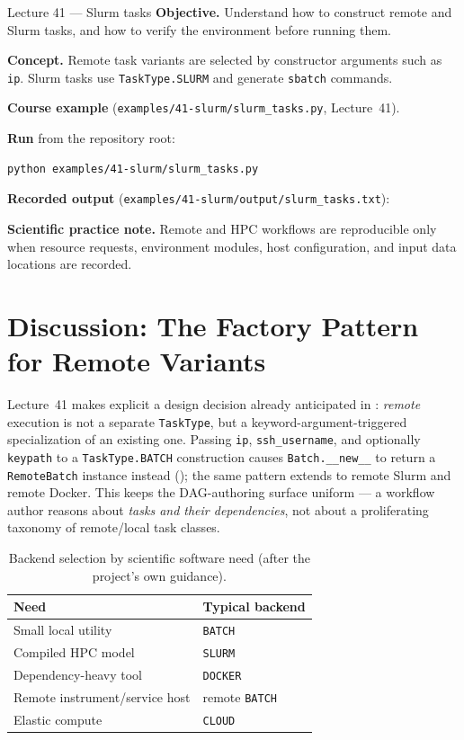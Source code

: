 \begin{lessonbox}{Lecture 41 --- Slurm tasks}
\textbf{Objective.} Understand how to construct remote and Slurm tasks, and
how to verify the environment before running them.

\textbf{Concept.} Remote task variants are selected by constructor arguments
such as \texttt{ip}. Slurm tasks use \texttt{TaskType.SLURM} and generate
\texttt{sbatch} commands.

\textbf{Course example} (\texttt{examples/41-slurm/slurm\_tasks.py}, Lecture~41).


\textbf{Run} from the repository root:
\begin{lstlisting}[style=bash]
python examples/41-slurm/slurm_tasks.py
\end{lstlisting}

\textbf{Recorded output} (\texttt{examples/41-slurm/output/slurm\_tasks.txt}):


\textbf{Scientific practice note.} Remote and HPC workflows are reproducible
only when resource requests, environment modules, host configuration, and
input data locations are recorded.
\end{lessonbox}

\section{Discussion: The Factory Pattern for Remote Variants}

Lecture~41 makes explicit a design decision already anticipated in
: \emph{remote} execution is not a separate
\texttt{TaskType}, but a keyword-argument-triggered specialization of an
existing one. Passing \texttt{ip}, \texttt{ssh\_username}, and optionally
\texttt{keypath} to a \texttt{TaskType.BATCH} construction causes
\texttt{Batch.\_\_new\_\_} to return a \texttt{RemoteBatch} instance instead
(); the same pattern extends to remote Slurm and remote
Docker. This keeps the DAG-authoring surface uniform --- a workflow author
reasons about \emph{tasks and their dependencies}, not about a proliferating
taxonomy of remote/local task classes.

\begin{table}[h]
\centering
\caption{Backend selection by scientific software need (after the project's
own guidance).}
\label{tab:backend-selection}
\begin{tabular}{@{}ll@{}}
\toprule
\textbf{Need} & \textbf{Typical backend} \\
\midrule
Small local utility & \texttt{BATCH} \\
Compiled HPC model & \texttt{SLURM} \\
Dependency-heavy tool & \texttt{DOCKER} \\
Remote instrument/service host & remote \texttt{BATCH} \\
Elastic compute & \texttt{CLOUD} \\
\bottomrule
\end{tabular}
\end{table}

